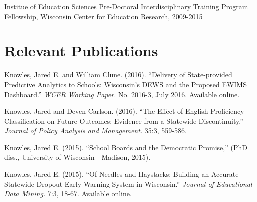 \documentclass[margin,line]{res}
\begin{document}
\begin{resume}
\vspace*{-2.5mm}

Institue of Education Sciences Pre-Doctoral Interdisciplinary Training Program 
Fellowship, Wisconsin Center for Education Research, 2009-2015


\vspace*{-2.5mm}
\section{\sc Relevant Publications}

Knowles, Jared E. and William Clune. (2016). ``Delivery of State-provided Predictive
Analytics to Schools: Wisconsin’s DEWS and the Proposed EWIMS Dashboard.'' 
\emph{WCER Working Paper.} No. 2016-3, July 2016. \href{http://wcer-web.ad.education.wisc.edu/docs/working-papers/Working_Paper_No_2016_03.pdf}{Available online.}

Knowles, Jared and Deven Carlson. (2016). ``The Effect of English Proficiency Classification on Future Outcomes: 
Evidence from a Statewide Discontinuity.'' \emph{Journal of Policy Analysis and Management.}
35:3, 559-586. 

Knowles, Jared E. (2015). ``School Boards and the Democratic Promise,'' (PhD diss., University of 
Wisconsin - Madison, 2015).

Knowles, Jared E. (2015). ``Of Needles and Haystacks: Building an Accurate Statewide 
Dropout Early Warning System in Wisconsin.'' \emph{Journal of Educational Data 
Mining.} 7:3, 18-67. 
\href{http://www.educationaldatamining.org/JEDM/index.php/JEDM/article/view/JEDM082}{Available online.}
% 
% 
% 
% 


\end{resume}
\end{document}
